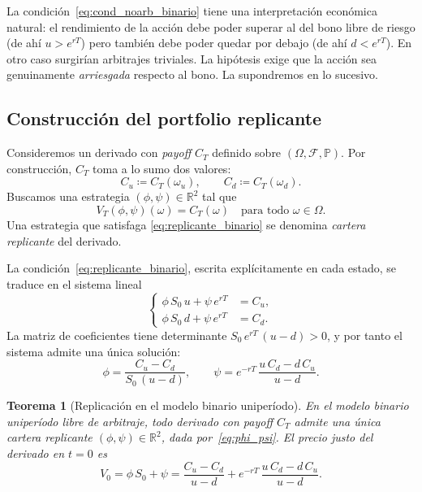 \documentclass[11pt,a4paper,oneside]{report}
\theoremstyle{plain}
\newtheorem{teorema}{Teorema}[chapter]
\theoremstyle{definition}
\theoremstyle{remark}
\newcommand{\R}{\mathbb{R}}
\newcommand{\PP}{\mathbb{P}}
\newcommand{\F}{\mathcal{F}}
\newcommand{\1}{\mathbf{1}}
\newcommand{\eqdef}{\coloneqq}
\begin{document}
La condición~\eqref{eq:cond_noarb_binario} tiene una interpretación
económica natural: el rendimiento de la acción debe poder superar al
del bono libre de riesgo (de ahí $u > e^{rT}$) pero también debe poder
quedar por debajo (de ahí $d < e^{rT}$). En otro caso surgirían
arbitrajes triviales. La hipótesis exige que la acción sea genuinamente
\emph{arriesgada} respecto al bono. La supondremos en lo sucesivo.

\subsection{Construcción del portfolio replicante}
\label{subsec:replicante_binario}

Consideremos un derivado con \emph{payoff} $C_T$ definido sobre
$(\Omega, \F, \PP)$. Por construcción, $C_T$ toma a lo sumo dos
valores:
\begin{equation*}
  C_u \eqdef C_T(\omega_u), \qquad C_d \eqdef C_T(\omega_d).
\end{equation*}
Buscamos una estrategia $(\phi, \psi) \in \R^2$ tal que
\begin{equation}\label{eq:replicante_binario}
  V_T(\phi, \psi)(\omega) = C_T(\omega) \quad \text{para todo } \omega \in \Omega.
\end{equation}
Una estrategia que satisfaga \eqref{eq:replicante_binario} se denomina
\emph{cartera replicante} del derivado.

La condición~\eqref{eq:replicante_binario}, escrita explícitamente en
cada estado, se traduce en el sistema lineal
\begin{equation}\label{eq:sistema_replicante}
  \left\{
  \begin{aligned}
    \phi\, S_0\, u + \psi\, e^{rT} &= C_u, \\
    \phi\, S_0\, d + \psi\, e^{rT} &= C_d.
  \end{aligned}
  \right.
\end{equation}
La matriz de coeficientes tiene determinante $S_0\, e^{rT}\, (u - d) >
0$, y por tanto el sistema admite una única solución:
\begin{equation}\label{eq:phi_psi}
  \phi = \frac{C_u - C_d}{S_0\,(u - d)}, \qquad
  \psi = e^{-rT}\, \frac{u\, C_d - d\, C_u}{u - d}.
\end{equation}

\begin{teorema}[Replicación en el modelo binario uniperíodo]
\label{teo:replicacion_binario}
En el modelo binario uniperíodo libre de arbitraje, todo derivado con
\emph{payoff} $C_T$ admite una única cartera replicante $(\phi, \psi)
\in \R^2$, dada por~\eqref{eq:phi_psi}. El precio justo del derivado en
$t = 0$ es
\begin{equation}\label{eq:precio_binario}
  V_0 = \phi\, S_0 + \psi
       = \frac{C_u - C_d}{u - d}
       + e^{-rT}\, \frac{u\, C_d - d\, C_u}{u - d}.
\end{equation}
\end{teorema}
\end{document}
